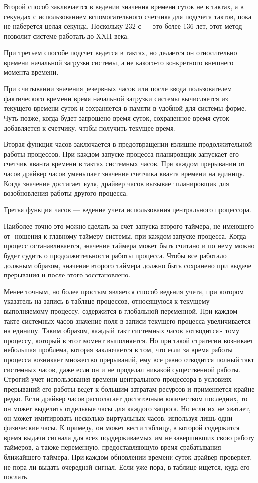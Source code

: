Второй способ заключается в ведении значения времени суток не в тактах, а в секундах с использованием
вспомогательного счетчика для подсчета тактов, пока не наберется целая секунда. Поскольку 232 с — это более 136 лет, этот метод позволит системе работать до XXII века.

При третьем способе подсчет ведется в тактах, но делается он относительно времени
начальной загрузки системы, а не какого-то конкретного внешнего момента времени.

При считывании значения резервных часов или после ввода пользователем фактического времени время начальной загрузки системы вычисляется из текущего времени
суток и сохраняется в памяти в удобной для системы форме. Чуть позже, когда будет
запрошено время суток, сохраненное время суток добавляется к счетчику, чтобы получить текущее время.

Вторая функция часов заключается в предотвращении излишне продолжительной
работы процессов. При каждом запуске процесса планировщик запускает его счетчик
кванта времени в тактах системных часов. При каждом прерывании от часов драйвер
часов уменьшает значение счетчика кванта времени на единицу. Когда значение достигает нуля, драйвер часов вызывает планировщик для возобновления работы другого
процесса.

Третья функция часов — ведение учета использования центрального процессора.

Наиболее точно это можно сделать за счет запуска второго таймера, не имеющего от-
ношения к главному таймеру системы, при каждом запуске процесса. Когда процесс
останавливается, значение таймера может быть считано и по нему можно будет судить
о продолжительности работы процесса. Чтобы все работало должным образом, значение второго таймера должно быть сохранено при выдаче прерывания и после этого
восстановлено. 

Менее точным, но более простым является способ ведения учета, при котором указатель на запись в таблице процессов, относящуюся к текущему выполняемому процессу,
содержится в глобальной переменной. При каждом такте системных часов значение
поля в записи текущего процесса увеличивается на единицу. Таким образом, каждый
такт системных часов «отводится» тому процессу, который в этот момент выполняется.
Но при такой стратегии возникает небольшая проблема, которая заключается в том, что
если за время работы процесса возникает множество прерываний, ему все равно отводится полный такт системных часов, даже если он и не проделал никакой существенной
работы. Строгий учет использования времени центрального процессора в условиях прерываний его работы ведет к большим затратам ресурсов и применяется крайне редко. Если драйвер часов располагает достаточным количеством последних, то он может
выделить отдельные часы для каждого запроса. Но если их не хватает, он может
имитировать несколько виртуальных часов, используя лишь одни физические часы.
К примеру, он может вести таблицу, в которой содержится время выдачи сигнала для
всех поддерживаемых им не завершивших свою работу таймеров, а также переменную,
предоставляющую время срабатывания ближайшего таймера. При каждом обновлении
времени суток драйвер проверяет, не пора ли выдать очередной сигнал. Если уже пора,
в таблице ищется, куда его послать.

